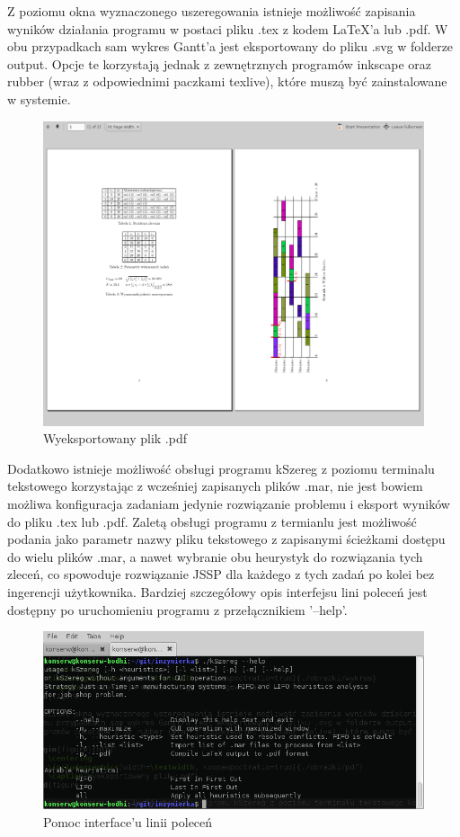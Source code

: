 \documentclass[twoside]{kInzynierka}
\begin{document}
Z poziomu okna wyznaczonego uszeregowania istnieje możliwość zapisania wyników działania programu w postaci pliku .tex z kodem \LaTeX{}'a lub .pdf. W obu przypadkach sam wykres Gantt'a jest eksportowany do pliku .svg w folderze output. Opcje te korzystają jednak z zewnętrznych programów inkscape oraz rubber (wraz z odpowiednimi paczkami texlive), które muszą być zainstalowane w systemie. 

\begin{figure}[htb]
    \centering
    \includegraphics[width=\textwidth, keepaspectratio=true]{./obrazki/pdf}
    \caption{Wyeksportowany plik .pdf}
\end{figure}

Dodatkowo istnieje możliwość obsługi programu kSzereg z poziomu terminalu tekstowego korzystając z wcześniej zapisanych plików .mar, nie jest bowiem możliwa konfiguracja zadaniam jedynie rozwiązanie problemu i eksport wyników do pliku .tex lub .pdf. Zaletą obsługi programu z termianlu jest możliwość podania jako parametr nazwy pliku tekstowego z zapisanymi ścieżkami dostępu do wielu plików .mar, a nawet wybranie obu heurystyk do rozwiązania tych zleceń, co spowoduje rozwiązanie JSSP dla każdego z tych zadań po kolei bez ingerencji użytkownika. Bardziej szczegółowy opis interfejsu lini poleceń jest dostępny po uruchomieniu programu z przełącznikiem '--help'.

\begin{figure}[htb]
    \centering
    \includegraphics[width=\textwidth, keepaspectratio=true]{./obrazki/cli}
    \caption{Pomoc interface'u linii poleceń}
\end{figure}
\end{document}
